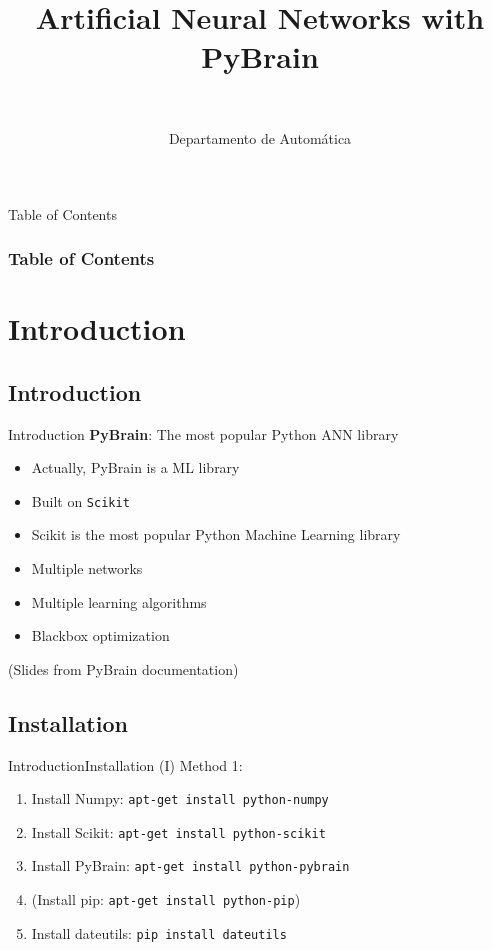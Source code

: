 \documentclass[10pt,compress]{beamer} %
\title[Aritificial Neural Networks with PyBrain]{Artificial Neural Networks with PyBrain}
\author{\asignatura\\\carrera}
\institute{}
\date{Departamento de Automática}
\begin{document}
{\titlepageBlue
    \begin{frame}
        \titlepage
    \end{frame}
}

{
\begin{frame}[shrink]{Table of Contents}
 \frametitle{Table of Contents}
 \tableofcontents
\end{frame}
}

\section{Introduction}
\subsection{Introduction}

\begin{frame}{Introduction}
	\textbf{PyBrain}: The most popular Python ANN library
	\begin{itemize}
		\item Actually, PyBrain is a ML library
		\item Built on \texttt{Scikit}
		\item Scikit is the most popular Python Machine Learning library
		\item Multiple networks
		\item Multiple learning algorithms
		\item Blackbox optimization
	\end{itemize}
	\small (Slides from PyBrain documentation)
\end{frame}

\subsection{Installation}
\begin{frame}{Introduction}{Installation (I)}
	Method 1:
	\begin{enumerate}
		\item Install Numpy: \texttt{apt-get install python-numpy}
		\item Install Scikit: \texttt{apt-get install python-scikit}
		\item Install PyBrain: \texttt{apt-get install python-pybrain}
		\item (Install pip: \texttt{apt-get install python-pip})
		\item Install dateutils: \texttt{pip install dateutils}
	\end{enumerate}

\end{frame}
\end{document}
